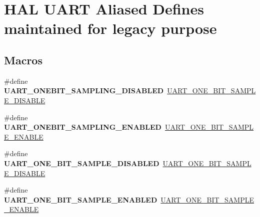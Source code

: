 \hypertarget{group___h_a_l___u_a_r_t___aliased___defines}{}\section{H\+AL U\+A\+RT Aliased Defines maintained for legacy purpose}
\label{group___h_a_l___u_a_r_t___aliased___defines}
\subsection*{Macros}
\begin{DoxyCompactItemize}
\item 
\mbox{\label{group___h_a_l___u_a_r_t___aliased___defines_gab24a7dd52e7b30408662b4d8abc23201}} 
\#define {\bfseries U\+A\+R\+T\+\_\+\+O\+N\+E\+B\+I\+T\+\_\+\+S\+A\+M\+P\+L\+I\+N\+G\+\_\+\+D\+I\+S\+A\+B\+L\+ED}~\mbox{\hyperlink{group___u_a_r_t___one_bit___sampling_gadfcb0e9db2719321048b249b2c5cc15f}{U\+A\+R\+T\+\_\+\+O\+N\+E\+\_\+\+B\+I\+T\+\_\+\+S\+A\+M\+P\+L\+E\+\_\+\+D\+I\+S\+A\+B\+LE}}
\item 
\mbox{\label{group___h_a_l___u_a_r_t___aliased___defines_gaee55ba79523b89ea4e6c18d7d45e310f}} 
\#define {\bfseries U\+A\+R\+T\+\_\+\+O\+N\+E\+B\+I\+T\+\_\+\+S\+A\+M\+P\+L\+I\+N\+G\+\_\+\+E\+N\+A\+B\+L\+ED}~\mbox{\hyperlink{group___u_a_r_t___one_bit___sampling_gadcc0aed6e7a466da3c45363f69dcbfb6}{U\+A\+R\+T\+\_\+\+O\+N\+E\+\_\+\+B\+I\+T\+\_\+\+S\+A\+M\+P\+L\+E\+\_\+\+E\+N\+A\+B\+LE}}
\item 
\mbox{\label{group___h_a_l___u_a_r_t___aliased___defines_gac3fb87f174fb4383fbc5f85e6cf2ff9f}} 
\#define {\bfseries U\+A\+R\+T\+\_\+\+O\+N\+E\+\_\+\+B\+I\+T\+\_\+\+S\+A\+M\+P\+L\+E\+\_\+\+D\+I\+S\+A\+B\+L\+ED}~\mbox{\hyperlink{group___u_a_r_t___one_bit___sampling_gadfcb0e9db2719321048b249b2c5cc15f}{U\+A\+R\+T\+\_\+\+O\+N\+E\+\_\+\+B\+I\+T\+\_\+\+S\+A\+M\+P\+L\+E\+\_\+\+D\+I\+S\+A\+B\+LE}}
\item 
\mbox{\label{group___h_a_l___u_a_r_t___aliased___defines_ga8ec1cb725dbf11a16e71c489fbe525bc}} 
\#define {\bfseries U\+A\+R\+T\+\_\+\+O\+N\+E\+\_\+\+B\+I\+T\+\_\+\+S\+A\+M\+P\+L\+E\+\_\+\+E\+N\+A\+B\+L\+ED}~\mbox{\hyperlink{group___u_a_r_t___one_bit___sampling_gadcc0aed6e7a466da3c45363f69dcbfb6}{U\+A\+R\+T\+\_\+\+O\+N\+E\+\_\+\+B\+I\+T\+\_\+\+S\+A\+M\+P\+L\+E\+\_\+\+E\+N\+A\+B\+LE}}

\end{DoxyCompactItemize}
